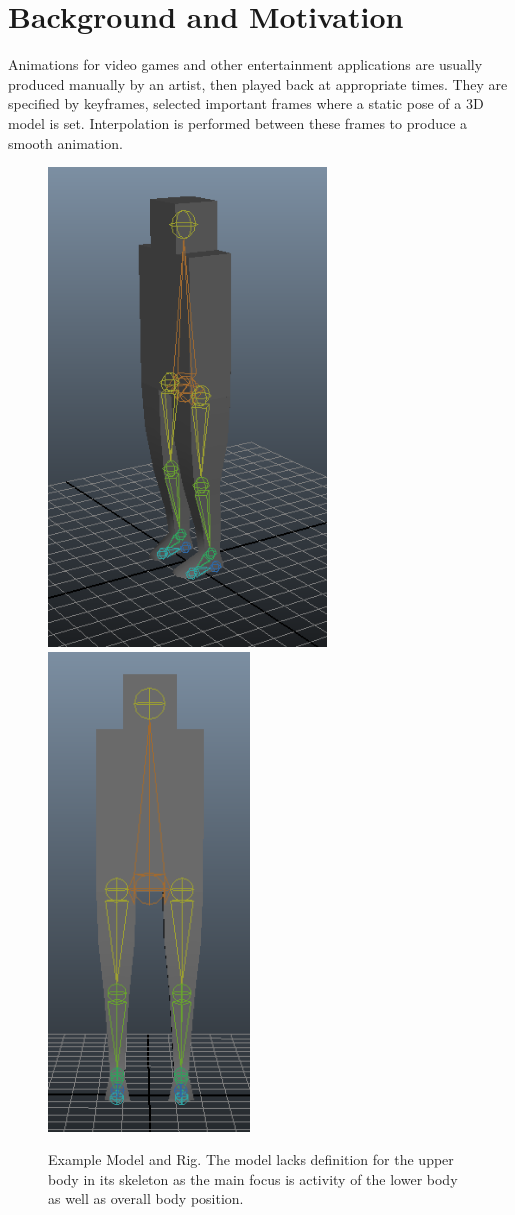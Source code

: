 \documentclass[landscape,26pt]{sciposter}
\begin{document}
\begin{minipage}[t]{10.5in}
	\section*{Background and Motivation}
        Animations for video games and other entertainment applications are usually produced manually by an artist, then played back at appropriate times.  They are specified by keyframes, selected important frames where a static pose of a 3D model is set.  Interpolation is performed between these frames to produce a smooth animation.  
		\begin{figure}
			\centering
            \includegraphics[height=5in]{skel_example/skel1.png}
            \includegraphics[height=5in]{skel_example/skel2.png}
			\caption{Example Model and Rig.  The model lacks definition for the upper body in its skeleton as the main focus is activity of the lower body as well as overall body position.}
		\end{figure}
		


\end{minipage}
\end{document}
